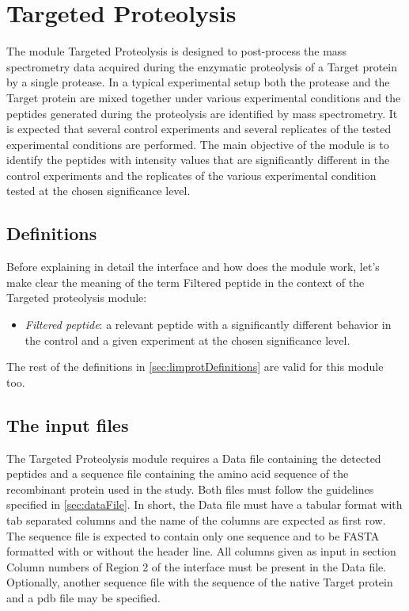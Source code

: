 \chapter{Targeted Proteolysis}
\label{chap:tarprot}

The module Targeted Proteolysis is designed to post-process the mass spectrometry
data acquired during the enzymatic proteolysis of a Target protein by a single
protease. In a typical experimental setup both the protease and the Target protein
are mixed together under various experimental conditions and the peptides generated
during the proteolysis are identified by mass spectrometry. It is expected that
several control experiments and several replicates of the tested experimental
conditions are performed. The main objective of the module is to identify the peptides
with intensity values that are significantly different in the control experiments
and the replicates of the various experimental condition tested at the chosen
significance level.

\section{Definitions}

Before explaining in detail the interface and how does the module work, let's make
clear the meaning of the term Filtered peptide in the context of the Targeted 
proteolysis module:

\begin{itemize}
    \item \textit{Filtered peptide}: a relevant peptide with a significantly different
    behavior in the control and a given experiment at the chosen significance level.
    \label{par:tarprotPIP}
\end{itemize}

The rest of the definitions in \autoref{sec:limprotDefinitions} are valid for this
module too.

\section{The input files}

The Targeted Proteolysis module requires a Data file containing the detected peptides and a sequence file containing the amino acid sequence of the recombinant protein used in the study. Both files must follow the guidelines specified in \autoref{sec:dataFile}. In short, the Data file must have a tabular format with tab separated columns and the name of the columns are expected as first row. The sequence file is expected to contain only one sequence and to be FASTA formatted with or without the header line. All columns given as input in section Column numbers of Region \num{2} of the interface must be present in the Data file. Optionally, another sequence file with the sequence of the native Target protein and a pdb file may be specified.

